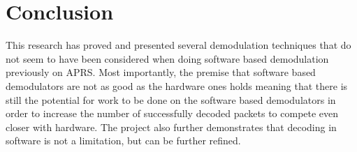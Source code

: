 \chapter{Conclusion}

This research has proved and presented several demodulation techniques that do not seem to have been considered when doing software based demodulation previously on APRS. Most importantly, the premise that software based demodulators are not as good as the hardware ones holds meaning that there is still the potential for work to be done on the software based demodulators in order to increase the number of successfully decoded packets to compete even closer with hardware. The project also further demonstrates that decoding in software is not a limitation, but can be further refined.
